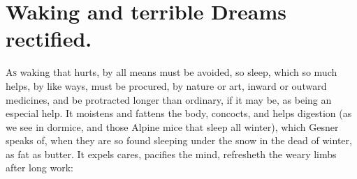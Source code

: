 {%

\section{Waking and terrible Dreams rectified.}

\lettrine{A}{s} waking that hurts, by all means must be avoided, so sleep, which so
much helps, by like ways, must be procured, by nature or art,
inward or outward medicines, and be protracted longer than ordinary, if
it may be, as being an especial help. It moistens and fattens the body,
concocts, and helps digestion (as we see in dormice, and those Alpine
mice that sleep all winter), which Gesner speaks of, when they are so
found sleeping under the snow in the dead of winter, as fat as butter.
It expels cares, pacifies the mind, refresheth the weary limbs after
long work:

}

